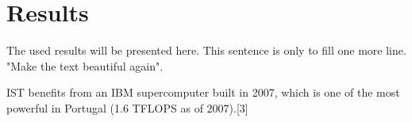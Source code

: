 \section{Results}
\label{sec:Results}


The used results will be presented here. This sentence is only to fill one more line. "Make the text beautiful again".

IST benefits from an IBM supercomputer built in 2007, which is one of the most powerful in Portugal (1.6 TFLOPS as of 2007).[3]


